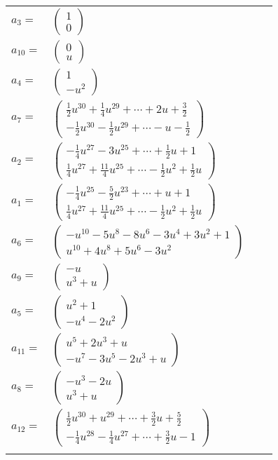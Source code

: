 \documentclass[1p]{elsarticle_modified}
\theoremstyle{definition}
\begin{document}
\begin{tabular}{m{7pt} m{180pt} m{7pt} m{180pt} }
\flushright $a_{3}=$&$\begin{pmatrix}1\\0\end{pmatrix}$ \\
\flushright $a_{10}=$&$\begin{pmatrix}0\\u\end{pmatrix}$ \\
\flushright $a_{4}=$&$\begin{pmatrix}1\\- u^2\end{pmatrix}$ \\
\flushright $a_{7}=$&$\begin{pmatrix}\frac{1}{2} u^{30}+\frac{1}{4} u^{29}+\cdots+2 u+\frac{3}{2}\\-\frac{1}{2} u^{30}-\frac{1}{2} u^{29}+\cdots- u-\frac{1}{2}\end{pmatrix}$ \\
\flushright $a_{2}=$&$\begin{pmatrix}-\frac{1}{4} u^{27}-3 u^{25}+\cdots+\frac{1}{2} u+1\\\frac{1}{4} u^{27}+\frac{11}{4} u^{25}+\cdots-\frac{1}{2} u^2+\frac{1}{2} u\end{pmatrix}$ \\
\flushright $a_{1}=$&$\begin{pmatrix}-\frac{1}{4} u^{25}-\frac{5}{2} u^{23}+\cdots+u+1\\\frac{1}{4} u^{27}+\frac{11}{4} u^{25}+\cdots-\frac{1}{2} u^2+\frac{1}{2} u\end{pmatrix}$ \\
\flushright $a_{6}=$&$\begin{pmatrix}- u^{10}-5 u^8-8 u^6-3 u^4+3 u^2+1\\u^{10}+4 u^8+5 u^6-3 u^2\end{pmatrix}$ \\
\flushright $a_{9}=$&$\begin{pmatrix}- u\\u^3+u\end{pmatrix}$ \\
\flushright $a_{5}=$&$\begin{pmatrix}u^2+1\\- u^4-2 u^2\end{pmatrix}$ \\
\flushright $a_{11}=$&$\begin{pmatrix}u^5+2 u^3+u\\- u^7-3 u^5-2 u^3+u\end{pmatrix}$ \\
\flushright $a_{8}=$&$\begin{pmatrix}- u^3-2 u\\u^3+u\end{pmatrix}$ \\
\flushright $a_{12}=$&$\begin{pmatrix}\frac{1}{2} u^{30}+u^{29}+\cdots+\frac{3}{2} u+\frac{5}{2}\\-\frac{1}{4} u^{28}-\frac{1}{4} u^{27}+\cdots+\frac{3}{2} u-1\end{pmatrix}$\\&\end{tabular}
\end{document}
